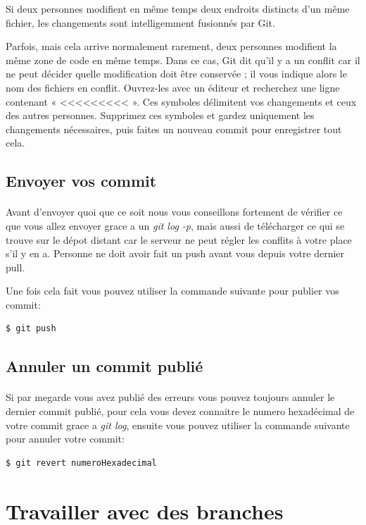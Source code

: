 \documentclass[french, a4paper, 12pt, titlepage]{article}
\begin{document}
Si deux personnes modifient en même temps deux endroits distincts d’un même fichier, les changements sont intelligemment fusionnés par Git.

Parfois, mais cela arrive normalement rarement, deux personnes modifient la même zone de code en même temps. Dans ce cas, Git dit qu’il y a un conflit car il ne peut décider quelle modification doit être conservée ; il vous indique alors le nom des fichiers en conflit. Ouvrez-les avec un éditeur et recherchez une ligne contenant « <<<<<<<<< ». Ces symboles délimitent vos changements et ceux des autres personnes. Supprimez ces symboles et gardez uniquement les changements nécessaires, puis faites un nouveau commit pour enregistrer tout cela.

\subsection{Envoyer vos commit}
\paragraph{}Avant d'envoyer quoi que ce soit nous vous conseillons fortement de vérifier ce que vous allez envoyer grace a un \emph{git log -p}, mais aussi de télécharger ce qui se trouve sur le dépot distant car le serveur ne peut régler les conflits à votre place s’il y en a. Personne ne doit avoir fait un push avant vous depuis votre dernier pull.

Une fois cela fait vous pouvez utiliser la commande suivante pour publier vos commit:
\begin{lstlisting}
$ git push
\end{lstlisting}

\subsection{Annuler un commit publié}
\paragraph{}Si par megarde vous avez publié des erreurs vous pouvez toujours annuler le dernier commit publié, pour cela vous devez connaitre le numero hexadécimal de votre commit grace a \emph{git log}, ensuite vous pouvez utiliser la commande suivante pour annuler votre commit:
\begin{lstlisting}
$ git revert numeroHexadecimal
\end{lstlisting}

\section{Travailler avec des branches}
\end{document}
